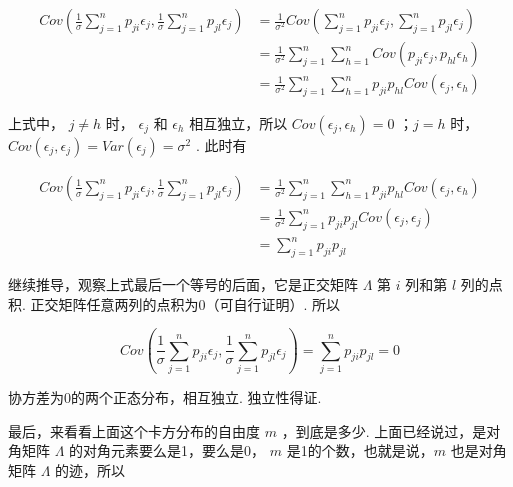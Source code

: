\documentclass[UTF8]{ctexart}
\begin{document}
    \begin{equation}
    	\begin{aligned}
    	    Cov(\frac{1}{\sigma} \sum_{j=1}^{n}{p_{ji} \epsilon_{j}}, \frac{1}{\sigma} \sum_{j=1}^{n}{p_{jl} \epsilon_{j}}) & = \frac{1}{\sigma^2} Cov(\sum_{j=1}^{n}{p_{ji} \epsilon_{j}}, \sum_{j=1}^{n}{p_{jl} \epsilon_{j}}) \\
    	    & = \frac{1}{\sigma^2} \sum_{j=1}^{n} \sum_{h=1}^{n} Cov(p_{ji} \epsilon_{j}, p_{hl} \epsilon_{h}) \\
    	    & = \frac{1}{\sigma^2} \sum_{j=1}^{n} \sum_{h=1}^{n} p_{ji} p_{hl} Cov(\epsilon_{j}, \epsilon_{h})
    	\end{aligned}
    \end{equation}

    上式中， $ j \ne h $ 时， $ \epsilon_j $ 和 $ \epsilon_h $ 相互独立，所以 $ Cov(\epsilon_j, \epsilon_h) = 0 $ ；$ j = h $ 时， $ Cov(\epsilon_j, \epsilon_j) = Var(\epsilon_j) = \sigma^2 $ . 此时有
    
    \begin{equation}
    	\begin{aligned}
    		Cov(\frac{1}{\sigma} \sum_{j=1}^{n}{p_{ji} \epsilon_{j}}, \frac{1}{\sigma} \sum_{j=1}^{n}{p_{jl} \epsilon_{j}}) & = \frac{1}{\sigma^2} \sum_{j=1}^{n} \sum_{h=1}^{n} p_{ji} p_{hl} Cov(\epsilon_{j}, \epsilon_{h}) \\
    		& = \frac{1}{\sigma^2} \sum_{j=1}^{n} p_{ji} p_{jl} Cov(\epsilon_{j}, \epsilon_{j}) \\
    		& = \sum_{j=1}^{n} p_{ji} p_{jl}
    	\end{aligned}
    \end{equation}

    继续推导，观察上式最后一个等号的后面，它是正交矩阵 $ \boldsymbol{\varLambda} $ 第 $ i $ 列和第 $ l $ 列的点积. 正交矩阵任意两列的点积为0（可自行证明）. 所以
    
    \begin{equation}
        Cov(\frac{1}{\sigma} \sum_{j=1}^{n}{p_{ji} \epsilon_{j}}, \frac{1}{\sigma} \sum_{j=1}^{n}{p_{jl} \epsilon_{j}}) = \sum_{j=1}^{n} p_{ji} p_{jl} = 0
    \end{equation}
    
    协方差为0的两个正态分布，相互独立. 独立性得证. 
    
    最后，来看看上面这个卡方分布的自由度 $ m $ ，到底是多少. 上面已经说过，是对角矩阵 $ \boldsymbol{\varLambda} $ 的对角元素要么是1，要么是0， $ m $  是1的个数，也就是说，$ m $ 也是对角矩阵 $ \boldsymbol{\varLambda} $ 的迹，所以
    
\end{document}
